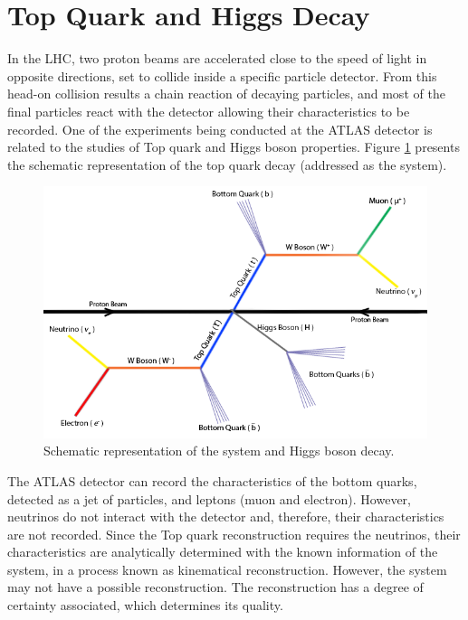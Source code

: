 \section{Top Quark and Higgs Decay}
\label{problem_and_app}

In the LHC, two proton beams are accelerated close to the speed of light in opposite directions, set to collide inside a specific particle detector. From this head-on collision results a chain reaction of decaying particles, and most of the final particles react with the detector allowing their characteristics to be recorded. One of the experiments being conducted at the ATLAS detector is related to the studies of Top quark and Higgs boson properties. Figure \ref{fig:ttbar} presents the schematic representation of the top quark decay (addressed as the \ttbar system).

\begin{figure}[!htp]
	\begin{center}
		\includegraphics[scale=0.4]{images/ttbar_higgs.png}
		\caption{Schematic representation of the \ttbar system and Higgs boson decay.}
		\label{fig:ttbar}
	\end{center}
\end{figure}

The ATLAS detector can record the characteristics of the bottom quarks, detected as a jet of particles, and leptons (muon and electron). However, neutrinos do not interact with the detector and, therefore, their characteristics are not recorded. Since the Top quark reconstruction requires the neutrinos, their characteristics are analytically determined with the known information of the system, in a process known as kinematical reconstruction. However, the \ttbar system may not have a possible reconstruction. The reconstruction has a degree of certainty associated, which determines its quality.

